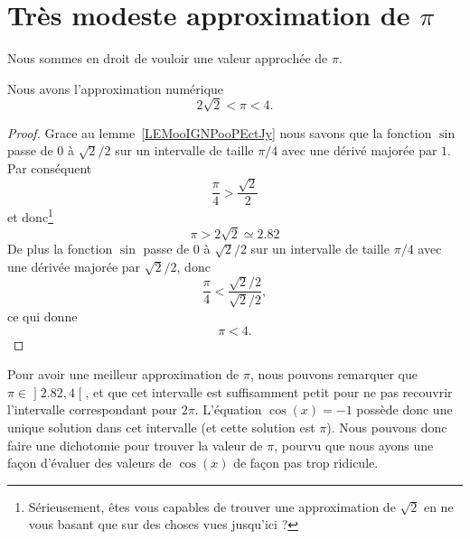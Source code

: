 
\section{Très modeste approximation de \texorpdfstring{\(  \pi\)}{pi}}

Nous sommes en droit de vouloir une valeur approchée de \( \pi\).
\begin{lemma}       \label{LEMooJWSGooExmtDA}
	Nous avons l'approximation numérique
	\begin{equation}
		2\sqrt{ 2 }<\pi<4.
	\end{equation}
\end{lemma}

\begin{proof}
	Grace au lemme~\ref{LEMooIGNPooPEctJy} nous savons que la fonction \( \sin\) passe de \( 0\) à \( \sqrt{ 2 }/2\) sur un intervalle de taille \( \pi/4\) avec une dérivé majorée par \( 1\). Par conséquent
	\begin{equation}
		\frac{ \pi }{ 4 }>\frac{ \sqrt{ 2 } }{2}
	\end{equation}
	et donc\footnote{Sérieusement, êtes vous capables de trouver une approximation de \( \sqrt{ 2 }\) en ne vous basant que sur des choses vues jusqu'ici ?}
	\begin{equation}
		\pi>2\sqrt{ 2 }\simeq 2.82
	\end{equation}
	De plus la fonction \( \sin\) passe de \( 0\) à \( \sqrt{ 2 }/2\) sur un intervalle de taille \( \pi/4\) avec une dérivée majorée par \( \sqrt{ 2 }/2\), donc
	\begin{equation}
		\frac{ \pi }{ 4 }<\frac{ \sqrt{ 2 }/2 }{ \sqrt{ 2 }/2 },
	\end{equation}
	ce qui donne
	\begin{equation}
		\pi<4.
	\end{equation}
\end{proof}

Pour avoir une meilleur approximation de \( \pi\), nous pouvons remarquer que \( \pi\in\mathopen] 2.82 , 4 \mathclose[\), et que cet intervalle est suffisamment petit pour ne pas recouvrir l'intervalle correspondant pour \( 2\pi\). L'équation \( \cos(x)=-1\) possède donc une unique solution dans cet intervalle (et cette solution est \( \pi\)). Nous pouvons donc faire une dichotomie pour trouver la valeur de \( \pi\), pourvu que nous ayons une façon d'évaluer des valeurs de \( \cos(x)\) de façon pas trop ridicule.

